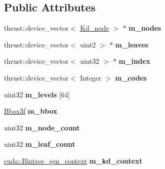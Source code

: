 \subsection*{\-Public \-Attributes}
\begin{DoxyCompactItemize}
\item 
\hypertarget{structnih_1_1cuda_1_1_kd__builder_a08ed3e8d20239991dba1a23ff1fdcba4}{
thrust\-::device\-\_\-vector$<$ \hyperlink{structnih_1_1_kd__node}{\-Kd\-\_\-node} $>$ $\ast$ {\bfseries m\-\_\-nodes}}
\label{structnih_1_1cuda_1_1_kd__builder_a08ed3e8d20239991dba1a23ff1fdcba4}

\item 
\hypertarget{structnih_1_1cuda_1_1_kd__builder_acd99a9d118fc9833452872c01518da9c}{
thrust\-::device\-\_\-vector$<$ uint2 $>$ $\ast$ {\bfseries m\-\_\-leaves}}
\label{structnih_1_1cuda_1_1_kd__builder_acd99a9d118fc9833452872c01518da9c}

\item 
\hypertarget{structnih_1_1cuda_1_1_kd__builder_af72f6b65b155825540de403a94b57327}{
thrust\-::device\-\_\-vector$<$ uint32 $>$ $\ast$ {\bfseries m\-\_\-index}}
\label{structnih_1_1cuda_1_1_kd__builder_af72f6b65b155825540de403a94b57327}

\item 
\hypertarget{structnih_1_1cuda_1_1_kd__builder_aa620524c7d26050cd6713b2fd619ed45}{
thrust\-::device\-\_\-vector$<$ \-Integer $>$ {\bfseries m\-\_\-codes}}
\label{structnih_1_1cuda_1_1_kd__builder_aa620524c7d26050cd6713b2fd619ed45}

\item 
\hypertarget{structnih_1_1cuda_1_1_kd__builder_aadd42d7e987727d8d480debfecc8e2fe}{
uint32 {\bfseries m\-\_\-levels} \mbox{[}64\mbox{]}}
\label{structnih_1_1cuda_1_1_kd__builder_aadd42d7e987727d8d480debfecc8e2fe}

\item 
\hypertarget{structnih_1_1cuda_1_1_kd__builder_a96b9aebcce9a59a0c9bfe82d973ce547}{
\hyperlink{structnih_1_1_bbox}{\-Bbox3f} {\bfseries m\-\_\-bbox}}
\label{structnih_1_1cuda_1_1_kd__builder_a96b9aebcce9a59a0c9bfe82d973ce547}

\item 
\hypertarget{structnih_1_1cuda_1_1_kd__builder_adfbb54bfad7dc7176f6d87585a1ab29c}{
uint32 {\bfseries m\-\_\-node\-\_\-count}}
\label{structnih_1_1cuda_1_1_kd__builder_adfbb54bfad7dc7176f6d87585a1ab29c}

\item 
\hypertarget{structnih_1_1cuda_1_1_kd__builder_a43a932652753fed10014c39973e5ac2c}{
uint32 {\bfseries m\-\_\-leaf\-\_\-count}}
\label{structnih_1_1cuda_1_1_kd__builder_a43a932652753fed10014c39973e5ac2c}

\item 
\hypertarget{structnih_1_1cuda_1_1_kd__builder_a158d2483ee18b23b53c9b1b5e9e55106}{
\hyperlink{structnih_1_1cuda_1_1_bintree__gen__context}{cuda\-::\-Bintree\-\_\-gen\-\_\-context} {\bfseries m\-\_\-kd\-\_\-context}}
\label{structnih_1_1cuda_1_1_kd__builder_a158d2483ee18b23b53c9b1b5e9e55106}

\end{DoxyCompactItemize}


